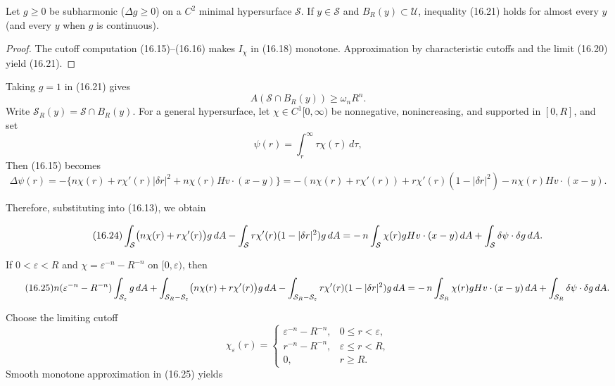 \begin{lemma}\label{gilbarg-trudinger.lem.16.2.mean-value}
Let $g\geq0$ be subharmonic ($\Delta g\geq0$) on a $C^2$ minimal hypersurface $\mathcal S$. If $y\in\mathcal S$ and $B_R(y)\subset\mathcal U$, inequality (16.21) holds for almost every $y$ (and every $y$ when $g$ is continuous).
\end{lemma}
\begin{proof}
\sketch The cutoff computation (16.15)--(16.16) makes $I_\chi$ in (16.18) monotone. Approximation by characteristic cutoffs and the limit (16.20) yield (16.21).
\end{proof}

Taking $g=1$ in (16.21) gives
\begin{equation}
A(\mathcal S\cap B_R(y))\ge\omega_nR^n.
\tag{16.22}
\end{equation}
Write $\mathcal S_R(y)=\mathcal S\cap B_R(y)$.  For a general
hypersurface, let $\chi\in C^1[0,\infty)$ be nonnegative, nonincreasing,
and supported in $[0,R]$, and set
\[
\psi(r)=\int_r^\infty \tau\chi(\tau)\,d\tau,
\]
Then (16.15) becomes
\begin{equation}\tag{16.23}
\Delta\psi(r)= -\{n\chi(r)+r\chi'(r)|\delta r|^2+n\chi(r)Hv\cdot (x-y)\}
=-(n\chi(r)+r\chi'(r))+r\chi'(r)(1-|\delta r|^2)-n\chi(r)Hv\cdot(x-y).
\end{equation}

Therefore, substituting into (16.13), we obtain

\begin{equation}\tag{16.24}
\int_{\mathcal{S}}\bigl(n\chi(r)+r\chi'(r)\bigr)g\,dA-\int_{\mathcal{S}}r\chi'(r)(1-|\delta r|^2)g\,dA
=-\,n\int_{\mathcal{S}}\chi(r)gHv\cdot(x-y)\,dA+\int_{\mathcal{S}}\delta\psi\cdot\delta g\,dA.
\end{equation}

If $0<\varepsilon<R$ and
$\chi=\varepsilon^{-n}-R^{-n}$ on $[0,\varepsilon)$, then
\begin{equation}\tag{16.25}
n(\varepsilon^{-n}-R^{-n})\int_{\mathcal{S}_\varepsilon}g\,dA+\int_{\mathcal{S}_R-\mathcal{S}_\varepsilon}\bigl(n\chi(r)+r\chi'(r)\bigr)g\,dA
-\int_{\mathcal{S}_R-\mathcal{S}_\varepsilon}r\chi'(r)(1-|\delta r|^2)g\,dA
=-\,n\int_{\mathcal{S}_R}\chi(r)gHv\cdot(x-y)\,dA+\int_{\mathcal{S}_R}\delta\psi\cdot\delta g\,dA.
\end{equation}


Choose the limiting cutoff
\[
\chi_\varepsilon(r)=
\begin{cases}
\varepsilon^{-n}-R^{-n},&0\le r<\varepsilon,\\
r^{-n}-R^{-n},&\varepsilon\le r<R,\\
0,&r\ge R.
\end{cases}
\]
Smooth monotone approximation in (16.25) yields

